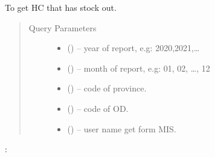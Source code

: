 \documentclass[letterpaper,10pt,english,openany,oneside]{sphinxmanual}
\begin{document}
\begin{fulllineitems}
\label{\detokenize{api-cmi/v1:get--api-malaria-info-v1-Surveillance-stock_out}}
\sphinxAtStartPar
To get HC that has stock out.
\begin{quote}\begin{description}
\item[{Query Parameters}] \leavevmode\begin{itemize}
\item {} 
\sphinxAtStartPar
{} () – year of report, e.g: 2020,2021,…

\item {} 
\sphinxAtStartPar
{} () – month of report, e.g: 01, 02, …, 12

\item {} 
\sphinxAtStartPar
{} () – code of province.

\item {} 
\sphinxAtStartPar
{} () – code of OD.

\item {} 
\sphinxAtStartPar
{} () – user name get form MIS.

\end{itemize}

\end{description}\end{quote}

\sphinxAtStartPar
{}:


\end{fulllineitems}
\end{document}
